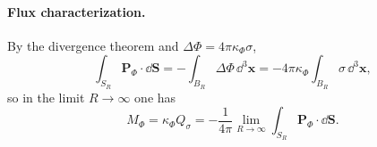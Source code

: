 \paragraph{Flux characterization.}
By the divergence theorem and $\Delta\Phi=4\pi\kappa_\Phi\sigma$,
\begin{equation}
\int_{S_R}\mathbf{P}_\Phi\cdot \dd\mathbf{S}
  = -\int_{B_R}\Delta\Phi\,\dd^3\mathbf{x}
  = -4\pi\kappa_\Phi\int_{B_R}\sigma\,\dd^3\mathbf{x},
\end{equation}
so in the limit $R\to\infty$ one has
\begin{equation}
  M_\Phi = \kappa_\Phi Q_\sigma
  = -\frac{1}{4\pi}\lim_{R\to\infty}\int_{S_R}\mathbf{P}_\Phi\cdot \dd\mathbf{S}.
\end{equation}


